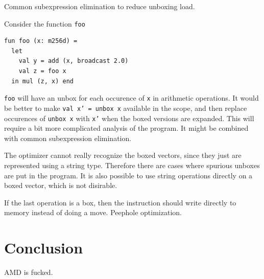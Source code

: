 \documentclass{article}
\begin{document}
Common subexpression elimination to reduce unboxing load.

Consider the function \texttt{foo}
\begin{lstlisting}
fun foo (x: m256d) =
  let
    val y = add (x, broadcast 2.0)
    val z = foo x
  in mul (z, x) end
\end{lstlisting}

\texttt{foo} will have an unbox for each occurence of \texttt{x} in arithmetic operations. It would be better to make \texttt{val x' = unbox x} available in the scope, and then replace occurences of \texttt{unbox x} with \texttt{x'} when the boxed versions are expanded. This will require a bit more complicated analysis of the program. It might be combined with common subexpression elimination.

The optimizer cannot really recognize the boxed vectors, since they just are represented using a string type. Therefore there are cases where spurious unboxes are put in the program. It is also possible to use string operations directly on a boxed vector, which is not disirable.

If the last operation is a box, then the instruction should write directly to memory instead of doing a move. Peephole optimization.

\section{Conclusion}

AMD is fucked.




\end{document}
